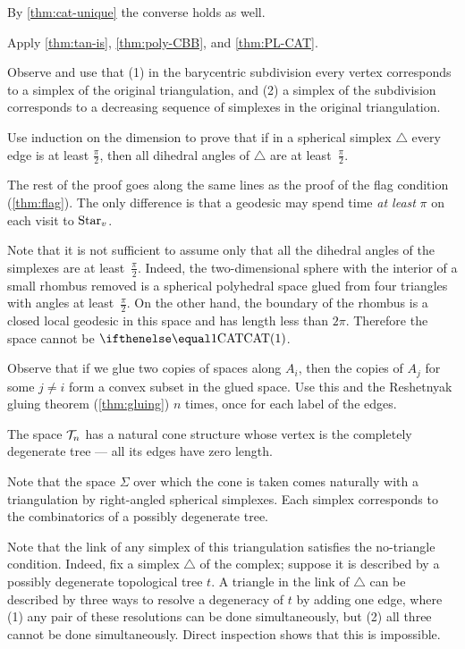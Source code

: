 By \ref{thm:cat-unique} the converse holds as well.

 Apply \ref{thm:tan-is}, \ref{thm:poly-CBB}, and \ref{thm:PL-CAT}.

Observe and use that (1) in the barycentric subdivision every vertex corresponds to a simplex of the original triangulation,
and (2) a simplex of the subdivision corresponds to a decreasing sequence of simplexes in the original triangulation. 

Use induction on the dimension  to prove that if in a spherical simplex $\triangle$ every edge is at least $\tfrac\pi2$, then 
all dihedral angles of $\triangle$ are at least~$\tfrac\pi2$.

The rest of the proof goes along the same lines as the proof of the flag condition (\ref{thm:flag}).
The only difference is that a geodesic may spend time {}\emph{at least} $\pi$ on each visit to $\mathop{\rm Star}\nolimits_v$.

Note that it is not sufficient to assume only that all the dihedral angles of the simplexes are at least~$\tfrac\pi2$. 
Indeed, the two-dimensional sphere with the interior of a small rhombus removed is a spherical polyhedral space glued from four triangles with angles at least~$\tfrac\pi2$.
On the other hand, the boundary of the rhombus is a closed local geodesic in this space and has length less than $2\pi$.
Therefore the space cannot be $\CAT1$.

Observe that if we glue two copies of spaces along $A_i$, then the copies of $A_j$ for some $j\ne i$ form a convex subset in the glued space.
Use this and the Reshetnyak gluing theorem (\ref{thm:gluing}) $n$ times, once for each label of the edges.

The space $\mathcal{T}_n$ has a natural cone structure whose vertex is the  completely degenerate tree --- all its edges have zero length.

Note that the space $\Sigma$
over which the cone is taken comes naturally with a triangulation 
by right-angled spherical simplexes.
Each simplex corresponds to the combinatorics of a possibly degenerate tree.

Note that the link of any simplex of this triangulation satisfies the no-triangle condition.
Indeed, fix a simplex $\triangle$ of the complex;
suppose it is described by a possibly degenerate topological tree $t$.
A triangle in the link of  $\triangle$ can be described by three ways to resolve a degeneracy of $t$ by adding one edge, where 
(1) any pair of these resolutions can be done simultaneously, but (2) all three cannot be done simultaneously.
Direct inspection shows that this is impossible.

